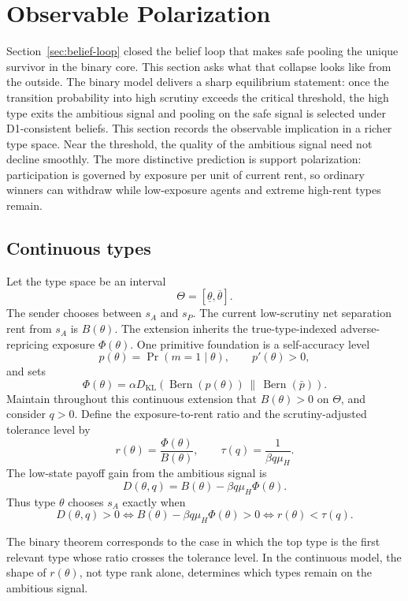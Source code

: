 \section{Observable Polarization}
\label{sec:polarization}

Section~\ref{sec:belief-loop} closed the belief loop that makes safe pooling the unique survivor in the binary core. This section asks what that collapse looks like from the outside. The binary model delivers a sharp equilibrium statement: once the transition probability into high scrutiny exceeds the critical threshold, the high type exits the ambitious signal and pooling on the safe signal is selected under D1-consistent beliefs. This section records the observable implication in a richer type space. Near the threshold, the quality of the ambitious signal need not decline smoothly. The more distinctive prediction is support polarization: participation is governed by exposure per unit of current rent, so ordinary winners can withdraw while low-exposure agents and extreme high-rent types remain.

\subsection{Continuous types}

Let the type space be an interval
\[
\Theta=[\underline\theta,\overline\theta].
\]
The sender chooses between \(s_A\) and \(s_P\). The current low-scrutiny net separation rent from \(s_A\) is \(B(\theta)\). The extension inherits the true-type-indexed adverse-repricing exposure \(\Phi(\theta)\). One primitive foundation is a self-accuracy level
\[
p(\theta)=\Pr(m=1\mid \theta),
\qquad
p'(\theta)>0,
\]
and sets
\[
\Phi(\theta)=
\alpha D_{\mathrm{KL}}
\left(
\operatorname{Bern}(p(\theta))
\,\middle\|\,
\operatorname{Bern}(\bar p)
\right).
\]
Maintain throughout this continuous extension that \(B(\theta)>0\) on \(\Theta\), and consider \(q>0\). Define the exposure-to-rent ratio and the scrutiny-adjusted tolerance level by
\[
r(\theta)=\frac{\Phi(\theta)}{B(\theta)},
\qquad
\tau(q)=\frac{1}{\beta q\mu_H}.
\]
The low-state payoff gain from the ambitious signal is
\[
D(\theta,q)=B(\theta)-\beta q\mu_H\Phi(\theta).
\]
Thus type \(\theta\) chooses \(s_A\) exactly when
\[
D(\theta,q)>0
\iff
B(\theta)-\beta q\mu_H\Phi(\theta)>0
\iff
r(\theta)<\tau(q).
\]

The binary theorem corresponds to the case in which the top type is the first relevant type whose ratio crosses the tolerance level. In the continuous model, the shape of \(r(\theta)\), not type rank alone, determines which types remain on the ambitious signal.

